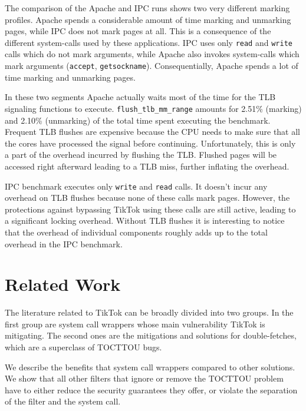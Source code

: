 The comparison of the Apache and IPC runs shows two very different marking
profiles. Apache spends a considerable amount of time marking and unmarking
pages, while IPC does not mark pages at all. This is a consequence of the
different system-calls used by these applications. IPC uses only \texttt{read}
and \texttt{write} calls which do not mark arguments, while Apache also invokes
system-calls which mark arguments (\texttt{accept}, \texttt{getsockname}).
Consequentially, Apache spends a lot of time marking and unmarking pages.

In these two segments Apache actually waits most of the time for the TLB
signaling functions to execute. \texttt{flush\_tlb\_mm\_range} amounts for
2.51\% (marking) and 2.10\% (unmarking) of the total time spent executing the
benchmark. Frequent TLB flushes are expensive because the CPU needs to make sure
that all the cores have processed the signal before continuing. Unfortunately,
this is only a part of the overhead incurred by flushing the TLB. Flushed pages
will be accessed right afterward leading to a TLB miss, further inflating the
overhead.

IPC benchmark executes only \texttt{write} and \texttt{read} calls. It doesn't
incur any overhead on TLB flushes because none of these calls mark pages.
However, the protections against bypassing TikTok using these calls are still
active, leading to a significant locking overhead. Without TLB flushes it is
interesting to notice that the overhead of individual components roughly adds
up to the total overhead in the IPC benchmark.


\section{Related Work}
\label{sec:relatedwork}

The literature related to TikTok can be broadly divided into two groups. In the
first group are system call wrappers whose main vulnerability TikTok is
mitigating. The second ones are the mitigations and solutions for
double-fetches, which are a superclass of TOCTTOU bugs.

We describe the benefits that system call wrappers compared to other solutions.
We show that all other filters that ignore or remove the TOCTTOU problem have
to either reduce the security guarantees they offer, or violate the separation
of the filter and the system call.

